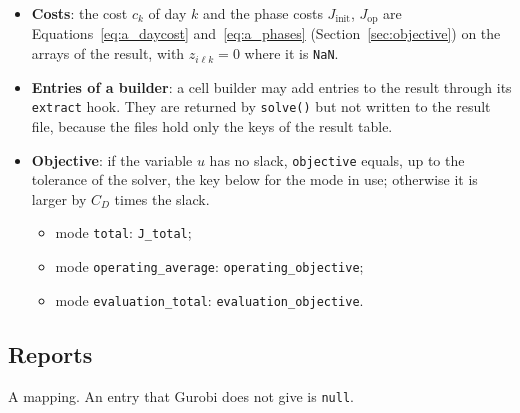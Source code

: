 \begin{itemize}[nosep,leftmargin=1.5em]
\begin{equation}
    \qquad
    u = \max_{i,k} \sum_{\ell=1}^{L} \mu_{i\ell k}^2 \quad (\texttt{quadratic}).
  \end{equation}
  \item \textbf{Costs}: the cost $c_k$ of day $k$ and the phase costs $J_{\mathrm{init}}$, $J_{\mathrm{op}}$ are Equations~\eqref{eq:a_daycost} and~\eqref{eq:a_phases} (Section~\ref{sec:objective}) on the arrays of the result, with $z_{i\ell k} = 0$ where it is \texttt{NaN}.
  \item \textbf{Entries of a builder}: a cell builder may add entries to the result through its \texttt{extract} hook. They are returned by \texttt{solve()} but not written to the result file, because the files hold only the keys of the result table.
  \item \textbf{Objective}: if the variable $u$ has no slack, \texttt{objective} equals, up to the tolerance of the solver, the key below for the mode in use; otherwise it is larger by $C_D$ times the slack.
  \begin{itemize}[nosep,leftmargin=1.5em]
    \item mode \texttt{total}: \texttt{J\_total};
    \item mode \texttt{operating\_average}: \texttt{operating\_objective};
    \item mode \texttt{evaluation\_total}: \texttt{evaluation\_objective}.
  \end{itemize}
\end{itemize}

\subsection{Reports}\label{sec:output_reports}

A mapping. An entry that Gurobi does not give is \texttt{null}.

